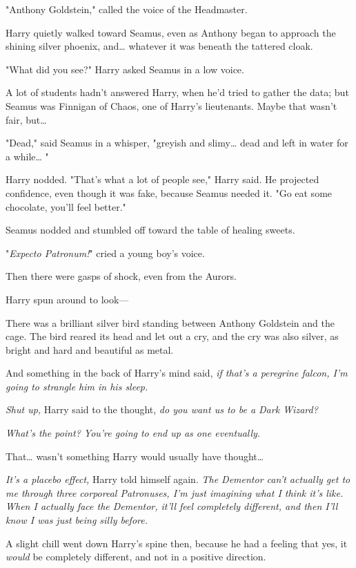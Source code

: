 "Anthony Goldstein," called the voice of the Headmaster.

Harry quietly walked toward Seamus, even as Anthony began to approach the
shining silver phoenix, and{\ldots} whatever it was beneath the tattered cloak.

"What did you see?" Harry asked Seamus in a low voice.

A lot of students hadn't answered Harry, when he'd tried to gather the data;
but Seamus was Finnigan of Chaos, one of Harry's lieutenants. Maybe that wasn't
fair, but{\ldots}

"Dead," said Seamus in a whisper, "greyish and slimy{\ldots} dead and left in
water for a while{\ldots} "

Harry nodded. "That's what a lot of people see," Harry said. He projected
confidence, even though it was fake, because Seamus needed it. "Go eat some
chocolate, you'll feel better."

Seamus nodded and stumbled off toward the table of healing sweets.

"\emph{Expecto Patronum!}" cried a young boy's voice.

Then there were gasps of shock, even from the Aurors.

Harry spun around to look---

There was a brilliant silver bird standing between Anthony Goldstein and the
cage. The bird reared its head and let out a cry, and the cry was also silver,
as bright and hard and beautiful as metal.

And something in the back of Harry's mind said, \emph{if that's a peregrine
falcon, I'm going to strangle him in his sleep.}

\emph{Shut up,} Harry said to the thought, \emph{do you want us to be a Dark
Wizard?}

\emph{What's the point? You're going to end up as one eventually.}

That{\ldots} wasn't something Harry would usually have thought{\ldots}

\emph{It's a placebo effect,} Harry told himself again. \emph{The Dementor
can't actually get to me through three corporeal Patronuses, I'm just imagining
what I think it's like. When I actually face the Dementor, it'll feel
completely different, and then I'll know I was just being silly before.}

A slight chill went down Harry's spine then, because he had a feeling that yes,
it \emph{would} be completely different, and not in a positive direction.

